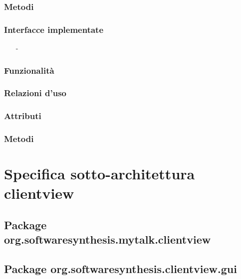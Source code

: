 \subsubsection*{Metodi}


\subsubsection*{Interfacce implementate}
\begin{itemize}[noitemsep,nolistsep]
  \item[-] 
\end{itemize}

\subsubsection*{Funzionalità}

\subsubsection*{Relazioni d'uso}

\subsubsection*{Attributi}

\subsubsection*{Metodi}

\clearpage

\section{Specifica sotto-architettura clientview}\label{sec:clientviewarchitecture}

\subsection{Package org.softwaresynthesis.mytalk.clientview}\label{sec:clientview}



\subsection{Package org.softwaresynthesis.clientview.gui}\label{sec:gui}

